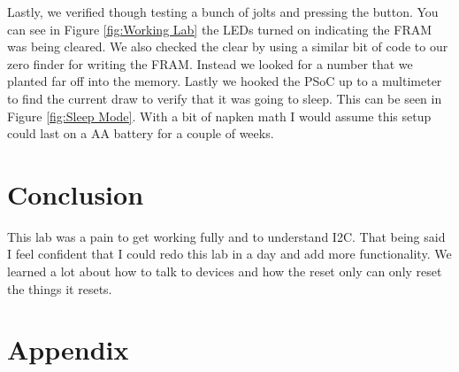 \documentclass{article}
\begin{document}
    Lastly, we verified though testing a bunch of jolts and pressing the button. You can see in Figure \ref{fig:Working Lab} the LEDs turned on indicating the FRAM was being cleared. We also checked the clear by using a similar bit of code to our zero finder for writing the FRAM. Instead we looked for a number that we planted far off into the memory. Lastly we hooked the PSoC up to a multimeter to find the current draw to verify that it was going to sleep. This can be seen in Figure \ref{fig:Sleep Mode}. With a bit of napken math I would assume this setup could last on a AA battery for a couple of weeks. 

\section*{Conclusion}

This lab was a pain to get working fully and to understand I2C. That being said I feel confident that I could redo this lab in a day and add more functionality. We learned a lot about how to talk to devices and how the reset only can only reset the things it resets. 

  \pagebreak 

\section*{Appendix}

  

  
  

  
  
\end{document}
